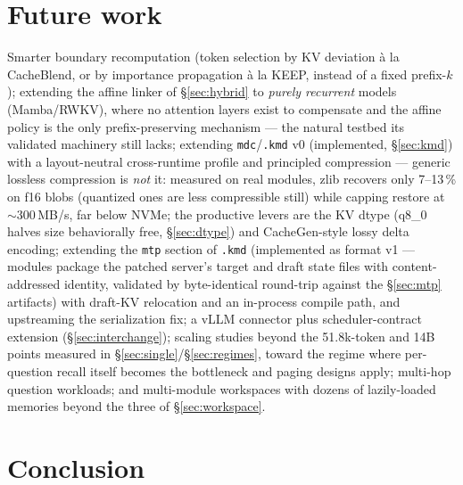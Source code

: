 \documentclass[11pt]{article}
\newcommand{\kmd}{\texttt{.kmd}}
\newcommand{\mdc}{\texttt{mdc}}
\newcommand{\code}[1]{\texttt{#1}}
\begin{document}
\section{Future work}
\label{sec:future}

Smarter boundary recomputation (token selection by KV deviation à la CacheBlend, or by importance propagation à la KEEP, instead of a fixed prefix-$k$); extending the affine linker of \S\ref{sec:hybrid} to \emph{purely recurrent} models (Mamba/RWKV), where no attention layers exist to compensate and the affine policy is the only prefix-preserving mechanism --- the natural testbed its validated machinery still lacks; extending \mdc{}/\kmd{} v0 (implemented, \S\ref{sec:kmd}) with a layout-neutral cross-runtime profile and principled compression --- generic lossless compression is \emph{not} it: measured on real modules, zlib recovers only 7--13\,\% on f16 blobs (quantized ones are less compressible still) while capping restore at ${\sim}300$\,MB/s, far below NVMe; the productive levers are the KV dtype (q8\_0 halves size behaviorally free, \S\ref{sec:dtype}) and CacheGen-style lossy delta encoding; extending the \code{mtp} section of \kmd{} (implemented as format v1 --- modules package the patched server's target and draft state files with content-addressed identity, validated by byte-identical round-trip against the \S\ref{sec:mtp} artifacts) with draft-KV relocation and an in-process compile path, and upstreaming the serialization fix; a vLLM connector plus scheduler-contract extension (\S\ref{sec:interchange}); scaling studies beyond the 51.8k-token and 14B points measured in \S\ref{sec:single}/\S\ref{sec:regimes}, toward the regime where per-question recall itself becomes the bottleneck and paging designs apply; multi-hop question workloads; and multi-module workspaces with dozens of lazily-loaded memories beyond the three of \S\ref{sec:workspace}.

\section{Conclusion}
\label{sec:conclusion}
\end{document}
